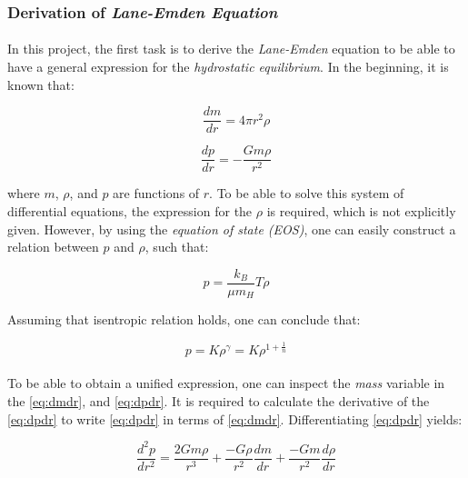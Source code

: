 \documentclass[letterpaper,12pt]{article}
\begin{document}
\subsubsection{Derivation of \textit{Lane-Emden Equation}}

\paragraph{} In this project, the first task is to derive the \textit{Lane-Emden} equation to be able to have a general expression for the \textit{hydrostatic equilibrium}. In the beginning, it is known that:

\begin{equation}
    \label{eq:dmdr}
    \frac{dm}{dr} = 4\pi r^2\rho
\end{equation}

\begin{equation}
    \label{eq:dpdr}
    \frac{dp}{dr} = -\frac{Gm\rho}{r^2}
\end{equation}

where $m$, $\rho$, and $p$ are functions of $r$. To be able to solve this system of differential equations, the expression for the $\rho$ is required, which is not explicitly given. However, by using the \textit{equation of state (EOS)}, one can easily construct a relation between $p$ and $\rho$, such that:

\begin{equation*}
    p = \frac{k_B}{\mu m_H}T\rho
\end{equation*}

Assuming that isentropic relation holds, one can conclude that:

\begin{equation}
    \label{eq:istro}
    p = K\rho^\gamma=K\rho^{1 + \frac{1}{n}} 
\end{equation}

\paragraph{} To be able to obtain a unified expression, one can inspect the \textit{mass} variable in the \eqref{eq:dmdr}, and \eqref{eq:dpdr}. It is required to calculate the derivative of the \eqref{eq:dpdr} to write \eqref{eq:dpdr} in terms of \eqref{eq:dmdr}. Differentiating \eqref{eq:dpdr} yields:

\begin{equation}
    \label{eq:d2pdr2-1}
    \frac{d^2p}{dr^2} = \frac{2Gm\rho}{r^3} + \frac{-G\rho}{r^2}\frac{dm}{dr} + \frac{-Gm}{r^2}\frac{d\rho}{dr}
\end{equation}
\end{document}
